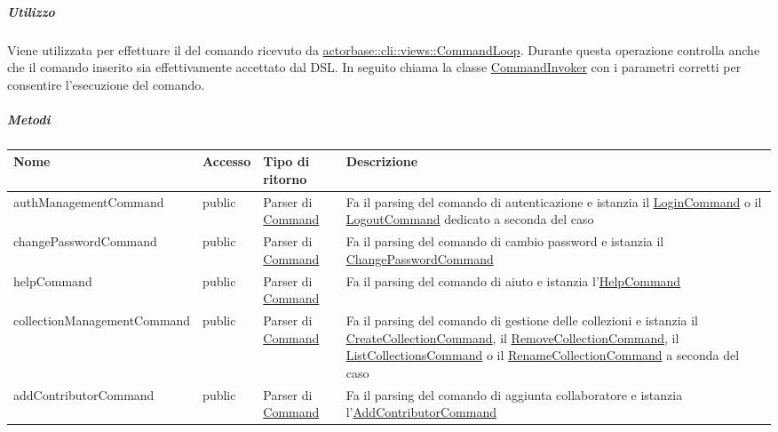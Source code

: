 \documentclass{scalatekids-article}
\begin{document}
\subparagraph{Utilizzo}

Viene utilizzata per effettuare il  del comando ricevuto da
\hyperref[sec:actorbase::cli::views::CommandLoop]{actorbase::cli::views::CommandLoop}.
Durante questa operazione controlla anche che il comando inserito sia effettivamente
accettato dal DSL. In seguito chiama la classe \hyperref[sec:actorbase::cli::models::CommandInvoker]{CommandInvoker}
con i parametri corretti per consentire l'esecuzione del comando.

\subparagraph{Metodi}

\begin{tabular}{| p{5.5cm} | p{1.5cm} | p{2cm} | p{7.5cm} |}
  \hline
  Nome & Accesso & Tipo di ritorno & Descrizione\\
  \hline
  authManagementCommand & public & Parser di \hyperref[sec:actorbase::cli::models::Command]{Command} & Fa il parsing del comando di autenticazione e istanzia il \hyperref[sec:actorbase::cli::models::LoginCommand]{LoginCommand} o il \hyperref[sec:actorbase::cli::models::LogoutCommand]{LogoutCommand} dedicato a seconda del caso\\
  \hline
  changePasswordCommand & public & Parser di \hyperref[sec:actorbase::cli::models::Command]{Command} & Fa il parsing del comando di cambio password e istanzia il \hyperref[sec:actorbase::cli::models::ChangePasswordCommand]{ChangePasswordCommand}\\
  \hline
  helpCommand & public & Parser di \hyperref[sec:actorbase::cli::models::Command]{Command} & Fa il parsing del comando di aiuto e istanzia l'\hyperref[sec:actorbase::cli::models::HelpCommand]{HelpCommand}\\
  \hline
  collectionManagementCommand & public & Parser di \hyperref[sec:actorbase::cli::models::Command]{Command} & Fa il parsing del comando di gestione delle collezioni e istanzia il \hyperref[sec:actorbase::cli::models::CreateCollectionCommand]{CreateCollectionCommand}, il \hyperref[sec:actorbase::cli::models::RemoveCollectionCommand]{RemoveCollectionCommand}, il \hyperref[sec:actorbase::cli::models::ListCollectionsCommand]{ListCollectionsCommand} o il \hyperref[sec:actorbase::cli::models::RenameCollectionCommand]{RenameCollectionCommand} a seconda del caso\\
  \hline
  addContributorCommand & public & Parser di \hyperref[sec:actorbase::cli::models::Command]{Command} & Fa il parsing del comando di aggiunta collaboratore e istanzia l'\hyperref[sec:actorbase::cli::models::AddContributorCommand]{AddContributorCommand}\\

\end{tabular}
\end{document}
